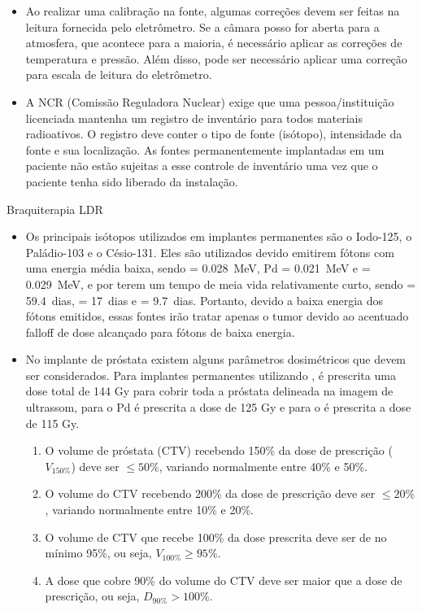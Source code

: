 \documentclass[11pt,a4paper]{article}
\newcounter{exemplo}
\begin{document}
\begin{exemplo}[8. Braquiterapia]
\begin{itemize}
        \item Ao realizar uma calibração na fonte, algumas correções devem ser feitas na leitura fornecida pelo eletrômetro. Se a câmara posso for aberta para a atmosfera, que acontece para a maioria, é necessário aplicar as correções de temperatura e pressão. Além disso, pode ser necessário aplicar uma correção para escala de leitura do eletrômetro. 
        
        \item A NCR (Comissão Reguladora Nuclear) exige que uma pessoa/instituição licenciada mantenha um registro de inventário para todos materiais radioativos. O registro deve conter o tipo de fonte (isótopo), intensidade da fonte e sua localização. As fontes permanentemente implantadas em um paciente não estão sujeitas a esse controle de inventário uma vez que o paciente tenha sido liberado da instalação. 

    \end{itemize}

    \textcolor{CarnationPink}{Braquiterapia LDR}
    \begin{itemize}
        \item Os principais isótopos utilizados em implantes permanentes são o Iodo-125, o Paládio-103 e o Césio-131.  Eles são utilizados devido emitirem fótons com uma energia média baixa, sendo  = \qty{0.028}{MeV}, Pd = \qty{0,021}{MeV} e  = \qty{0,029}{MeV}, e por terem um tempo de meia vida relativamente curto, sendo  = \qty{59.4}{dias},  = \qty{17}{dias} e  = \qty{9.7}{dias}. Portanto, devido a baixa energia dos fótons emitidos, essas fontes irão tratar apenas o tumor devido ao acentuado falloff de dose alcançado para fótons de baixa energia.
        
        \item No implante de próstata existem alguns parâmetros dosimétricos que devem ser considerados. Para implantes permanentes utilizando , é prescrita uma dose total de 144 Gy para cobrir toda a próstata delineada na imagem de ultrassom, para o Pd é prescrita a dose de 125 Gy e para o  é prescrita a dose de 115 Gy.
            \begin{enumerate}[label=label=\textcolor{CarnationPink}{\alph*)}]
                \item  O volume de próstata (CTV) recebendo 150\% da dose de prescrição ($V_{150\%}$) deve ser $\leq 50\%$, variando normalmente entre 40\% e 50\%.
                \item O volume do CTV recebendo 200\% da dose de prescrição deve ser $\leq 20\%$, variando normalmente entre 10\% e 20\%.
                \item O volume de CTV que recebe 100\% da dose prescrita deve ser de no mínimo 95\%, ou seja, $V_{100\%} \geq 95\%$.
                \item A dose que cobre 90\% do volume do CTV deve ser maior que a dose de prescrição, ou seja, $D_{90\%} > 100\%$. 
            \end{enumerate}


\end{itemize}
\end{exemplo}
\end{document}
